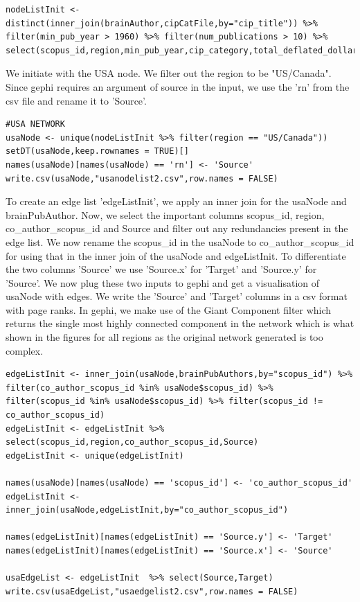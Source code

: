 \documentclass[a4paper,11pt]{article}
\theoremstyle{mytheor}
\begin{document}
\begin{lstlisting}
nodeListInit <- distinct(inner_join(brainAuthor,cipCatFile,by="cip_title")) %>% filter(min_pub_year > 1960) %>% filter(num_publications > 10) %>% select(scopus_id,region,min_pub_year,cip_category,total_deflated_dollar_2010)
\end{lstlisting}

We initiate with the USA node. We filter out the region to be "US/Canada". Since gephi requires an argument of source in the input, we use the 'rn' from the csv file and rename it to 'Source'. \newline

\begin{lstlisting}
#USA NETWORK
usaNode <- unique(nodeListInit %>% filter(region == "US/Canada")) 
setDT(usaNode,keep.rownames = TRUE)[]
names(usaNode)[names(usaNode) == 'rn'] <- 'Source'
write.csv(usaNode,"usanodelist2.csv",row.names = FALSE)
\end{lstlisting}

To create an edge list 'edgeListInit', we apply an inner join for the usaNode and brainPubAuthor. Now, we select the important columns scopus\_id, region, co\_author\_scopus\_id and Source and filter out any redundancies present in the edge list. We now rename the scopus\_id in the usaNode to co\_author\_scopus\_id for using that in the inner join of the usaNode and edgeListInit. To differentiate the two columns 'Source' we use 'Source.x' for 'Target' and 'Source.y' for 'Source'. We now plug these two inputs to gephi and get a visualisation of usaNode with edges. We write the 'Source' and 'Target' columns in a csv format with page ranks. In gephi, we make use of the Giant Component filter which returns the single most highly connected component in the network which is what shown in the figures for all regions as the original network generated is too complex.

\begin{lstlisting}
edgeListInit <- inner_join(usaNode,brainPubAuthors,by="scopus_id") %>% filter(co_author_scopus_id %in% usaNode$scopus_id) %>% filter(scopus_id %in% usaNode$scopus_id) %>% filter(scopus_id != co_author_scopus_id)
edgeListInit <- edgeListInit %>% select(scopus_id,region,co_author_scopus_id,Source)
edgeListInit <- unique(edgeListInit)

names(usaNode)[names(usaNode) == 'scopus_id'] <- 'co_author_scopus_id'
edgeListInit <- inner_join(usaNode,edgeListInit,by="co_author_scopus_id")

names(edgeListInit)[names(edgeListInit) == 'Source.y'] <- 'Target'
names(edgeListInit)[names(edgeListInit) == 'Source.x'] <- 'Source'

usaEdgeList <- edgeListInit  %>% select(Source,Target)
write.csv(usaEdgeList,"usaedgelist2.csv",row.names = FALSE)
\end{lstlisting}
\end{document}
